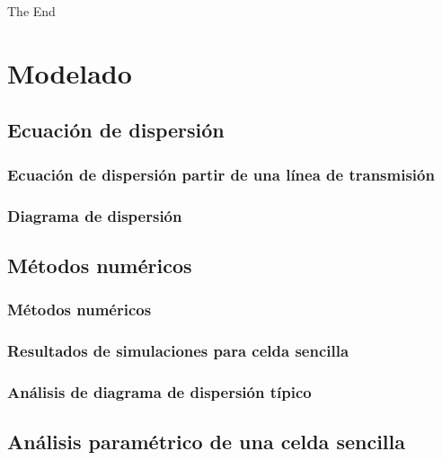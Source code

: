 \documentclass{beamer}
\begin{document}

\begin{frame}
\Huge{\centerline{The End}}
\end{frame}


\section{Modelado}

	\subsection{Ecuación de dispersión}
		\begin{frame} %
		\frametitle{Ecuación de dispersión partir de una línea de transmisión}
		\end{frame}
	 
	 	\begin{frame} %
	 	\frametitle{Diagrama de dispersión}
 	    \end{frame}
      
     \subsection{Métodos numéricos}
	    \begin{frame} %
	    \frametitle{Métodos numéricos}
	 	\end{frame}
	
		\begin{frame} %
		\frametitle{Resultados de simulaciones para celda sencilla}
		\end{frame}
		
		\begin{frame} %
		\frametitle{Análisis de diagrama de dispersión típico}
		\end{frame}
		
	 \subsection{Análisis paramétrico de una celda sencilla}
	 
\end{document}
